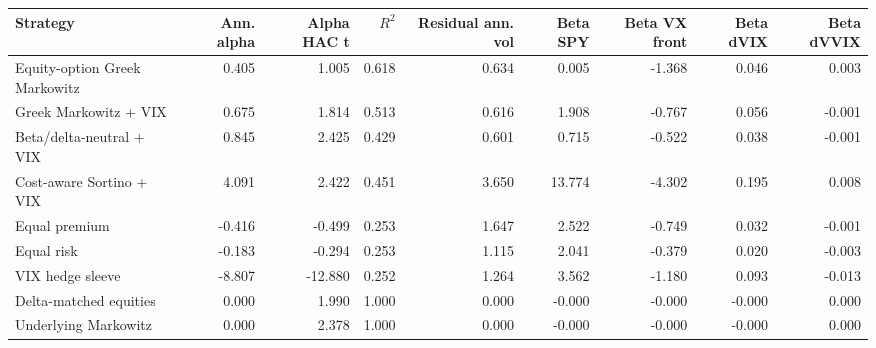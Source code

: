 \begin{tabular}{lrrrrrrrr}
\toprule
Strategy & Ann. alpha & Alpha HAC t & $R^2$ & Residual ann. vol & Beta SPY & Beta VX front & Beta dVIX & Beta dVVIX \\
\midrule
Equity-option Greek Markowitz & 0.405 & 1.005 & 0.618 & 0.634 & 0.005 & -1.368 & 0.046 & 0.003 \\
Greek Markowitz + VIX & 0.675 & 1.814 & 0.513 & 0.616 & 1.908 & -0.767 & 0.056 & -0.001 \\
Beta/delta-neutral + VIX & 0.845 & 2.425 & 0.429 & 0.601 & 0.715 & -0.522 & 0.038 & -0.001 \\
Cost-aware Sortino + VIX & 4.091 & 2.422 & 0.451 & 3.650 & 13.774 & -4.302 & 0.195 & 0.008 \\
Equal premium & -0.416 & -0.499 & 0.253 & 1.647 & 2.522 & -0.749 & 0.032 & -0.001 \\
Equal risk & -0.183 & -0.294 & 0.253 & 1.115 & 2.041 & -0.379 & 0.020 & -0.003 \\
VIX hedge sleeve & -8.807 & -12.880 & 0.252 & 1.264 & 3.562 & -1.180 & 0.093 & -0.013 \\
Delta-matched equities & 0.000 & 1.990 & 1.000 & 0.000 & -0.000 & -0.000 & -0.000 & 0.000 \\
Underlying Markowitz & 0.000 & 2.378 & 1.000 & 0.000 & -0.000 & -0.000 & -0.000 & 0.000 \\
\bottomrule
\end{tabular}
